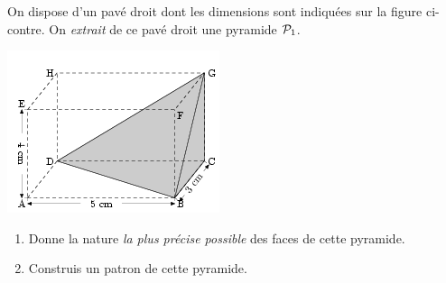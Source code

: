 
On dispose d'un pavé droit dont les
  dimensions sont indiquées sur la figure ci-contre. On {\em extrait}
  de ce pavé droit une pyramide ${\cal P}_1$.
  
\begin{center}
\includegraphics[scale=1]{RepS-25.png}
\end{center}

\begin{enumerate}
  \item Donne la nature {\em la plus précise possible} des faces de cette pyramide.
  \item Construis un patron de cette pyramide.
\end{enumerate}
